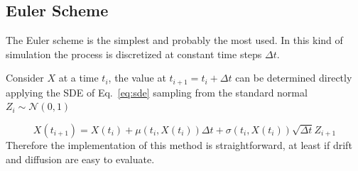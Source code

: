 
\subsection{Euler Scheme}
The Euler scheme is the simplest and probably the most used. In this kind of simulation the process is discretized at constant time steps $\Delta t$.

Consider $X$ at a time $t_i$, the value at $t_{i+1} = t_i +\Delta t$ can be determined directly applying the SDE of Eq.~\ref{eq:sde} sampling from the standard normal $Z_i ∼ \mathcal{N}(0,1)$

\begin{equation}
X(t_{i+1}) = X(t_i) + \mu(t_i , X(t_i))\Delta t + \sigma(t_i , X(t_i))\sqrt{\Delta t}Z_{i+1}
\label{eq:euler_scheme}
\end{equation}
Therefore the implementation of this method is straightforward, at least if drift and diffusion are easy to evaluate.

